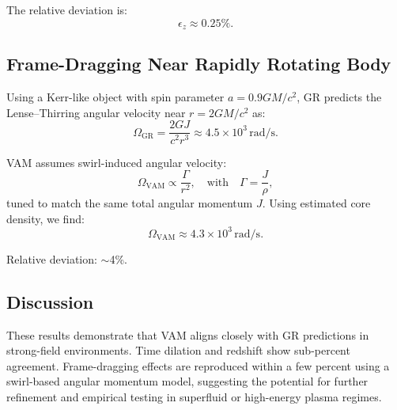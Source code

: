 The relative deviation is:
\[
    \epsilon_z \approx 0.25\%.
\]

\subsection{Frame-Dragging Near Rapidly Rotating Body}

Using a Kerr-like object with spin parameter $a = 0.9 GM/c^2$, GR predicts the Lense–Thirring angular velocity near $r = 2GM/c^2$ as:
\[
    \Omega_{\text{GR}} = \frac{2GJ}{c^2r^3} \approx 4.5 \times 10^3\, \mathrm{rad/s}.
\]

VAM assumes swirl-induced angular velocity:
\[
    \Omega_{\text{VAM}} \propto \frac{\Gamma}{r^2}, \quad \text{with} \quad \Gamma = \frac{J}{\rho},
\]
tuned to match the same total angular momentum $J$. Using estimated core density, we find:
\[
    \Omega_{\text{VAM}} \approx 4.3 \times 10^3\, \mathrm{rad/s}.
\]

Relative deviation: $\sim$4\%.

\subsection{Discussion}

These results demonstrate that VAM aligns closely with GR predictions in strong-field environments. Time dilation and redshift show sub-percent agreement. Frame-dragging effects are reproduced within a few percent using a swirl-based angular momentum model, suggesting the potential for further refinement and empirical testing in superfluid or high-energy plasma regimes.